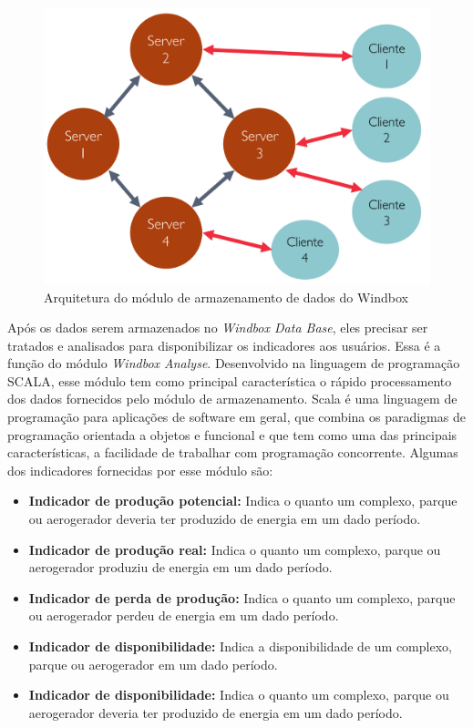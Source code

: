 \begin{figure}[htbp!] \begin{center}
\includegraphics[width=0.75\linewidth]{./figuras/arquitetura-banco-de-dados-windbox}
\caption{Arquitetura do módulo de armazenamento de dados do Windbox}
\label{Fig:moduloArmazenamentoDados}
\end{center} 
\end{figure}

Após os dados serem armazenados no \textit{Windbox Data Base}, eles precisar ser tratados e analisados para disponibilizar os indicadores aos usuários. Essa é a função do módulo \textit{Windbox Analyse}. Desenvolvido na linguagem de programação SCALA, esse módulo tem como principal característica o rápido processamento dos dados fornecidos pelo módulo de armazenamento. Scala é uma linguagem de programação para aplicações de software em geral, que combina os paradigmas de programação orientada a objetos e funcional e que tem como uma das principais características, a facilidade de trabalhar com programação concorrente. Algumas dos indicadores fornecidas por esse módulo são: 

\begin{itemize}
    \item \textbf{Indicador de produção potencial:} Indica o quanto um complexo, parque ou aerogerador deveria ter produzido de energia em um dado período.
    \item \textbf{Indicador de produção real:} Indica o quanto um complexo, parque ou aerogerador produziu de energia em um dado período.
    \item \textbf{Indicador de perda de produção:} Indica o quanto um complexo, parque ou aerogerador perdeu de energia em um dado período.
    \item \textbf{Indicador de disponibilidade:} Indica a disponibilidade de um complexo, parque ou aerogerador em um dado período.
    \item \textbf{Indicador de disponibilidade:} Indica o quanto um complexo, parque ou aerogerador deveria ter produzido de energia em um dado período.
\end{itemize}

